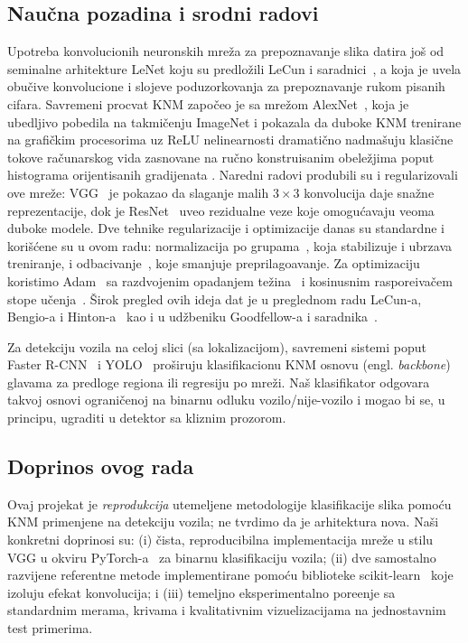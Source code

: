 \documentclass[11pt,a4paper]{article}
\begin{document}
\subsection{Nau\v cna pozadina i srodni radovi}
Upotreba konvolucionih neuronskih mre\v za za prepoznavanje slika datira jo\v s
od seminalne arhitekture LeNet koju su predlo\v zili LeCun i
saradnici~\cite{lecun1998gradient}, a koja je uvela obu\v cive konvolucione i
slojeve poduzorkovanja za prepoznavanje rukom pisanih cifara. Savremeni procvat
KNM zapo\v ceo je sa mre\v zom AlexNet~\cite{krizhevsky2012imagenet}, koja je
ubedljivo pobedila na takmi\v cenju ImageNet i pokazala da duboke KNM trenirane
na grafi\v ckim procesorima uz ReLU nelinearnosti dramati\v cno nadma\v suju
klasi\v cne tokove ra\v cunarskog vida zasnovane na ru\v cno konstruisanim
obele\v zjima poput histograma orijentisanih gradijenata
\cite{dalal2005histograms}. Naredni radovi produbili su i regularizovali ove
mre\v ze: VGG~\cite{simonyan2015very} je pokazao da slaganje malih $3\times 3$
konvolucija daje sna\v zne reprezentacije, dok je ResNet~\cite{he2016deep} uveo
rezidualne veze koje omogu\'cavaju veoma duboke modele. Dve tehnike
regularizacije i optimizacije danas su standardne i kori\v s\'cene su u ovom
radu: normalizacija po grupama~\cite{ioffe2015batch}, koja stabilizuje i
ubrzava treniranje, i odbacivanje~\cite{srivastava2014dropout}, koje smanjuje
preprilago\dj avanje. Za optimizaciju koristimo Adam~\cite{kingma2015adam} sa
razdvojenim opadanjem te\v zina~\cite{loshchilov2019decoupled} i kosinusnim
raspore\dj iva\v cem stope u\v cenja~\cite{loshchilov2017sgdr}. \v Sirok pregled
ovih ideja dat je u preglednom radu LeCun-a, Bengio-a i
Hinton-a~\cite{lecun2015deep} kao i u ud\v zbeniku Goodfellow-a i
saradnika~\cite{goodfellow2016deep}.

Za detekciju vozila na celoj slici (sa lokalizacijom), savremeni sistemi poput
Faster R-CNN~\cite{ren2015faster} i YOLO~\cite{redmon2016you} pro\v siruju
klasifikacionu KNM osnovu (engl. \emph{backbone}) glavama za predloge regiona
ili regresiju po mre\v zi. Na\v s klasifikator odgovara takvoj osnovi
ograni\v cenoj na binarnu odluku vozilo/nije-vozilo i mogao bi se, u principu,
ugraditi u detektor sa kliznim prozorom.

\subsection{Doprinos ovog rada}
Ovaj projekat je \emph{reprodukcija} utemeljene metodologije klasifikacije
slika pomo\'cu KNM primenjene na detekciju vozila; ne tvrdimo da je arhitektura
nova. Na\v si konkretni doprinosi su: (i) \v cista, reproducibilna implementacija
mre\v ze u stilu VGG u okviru PyTorch-a~\cite{paszke2019pytorch} za binarnu
klasifikaciju vozila; (ii) dve samostalno razvijene referentne metode
implementirane pomo\'cu biblioteke scikit-learn~\cite{pedregosa2011scikit} koje
izoluju efekat konvolucija; i (iii) temeljno eksperimentalno pore\dj enje sa
standardnim merama, krivama i kvalitativnim vizuelizacijama na jednostavnim
test primerima.
\end{document}
